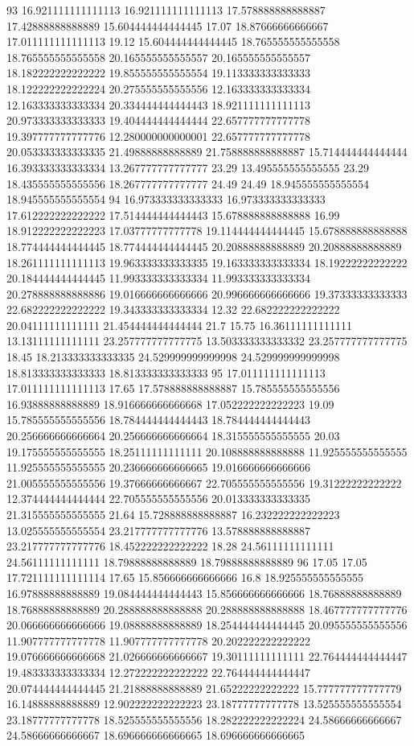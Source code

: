 93 16.921111111111113 16.921111111111113 17.578888888888887 17.42888888888889 15.604444444444445 17.07 18.87666666666667 17.011111111111113 19.12 15.604444444444445 18.765555555555558 18.765555555555558 20.165555555555557 20.165555555555557 18.182222222222222 19.855555555555554 19.113333333333333 18.122222222222224 20.275555555555556 12.163333333333334 12.163333333333334 20.334444444444443 18.921111111111113 20.973333333333333 19.404444444444444 22.657777777777778 19.397777777777776 12.280000000000001 22.657777777777778 20.053333333333335 21.49888888888889 21.758888888888887 15.714444444444444 16.393333333333334 13.267777777777777 23.29 13.495555555555555 23.29 18.435555555555556 18.267777777777777 24.49 24.49 18.945555555555554 18.945555555555554
94 16.973333333333333 16.973333333333333 17.612222222222222 17.514444444444443 15.678888888888888 16.99 18.912222222222223 17.03777777777778 19.114444444444445 15.678888888888888 18.774444444444445 18.774444444444445 20.20888888888889 20.20888888888889 18.261111111111113 19.963333333333335 19.163333333333334 18.19222222222222 20.184444444444445 11.993333333333334 11.993333333333334 20.278888888888886 19.016666666666666 20.996666666666666 19.37333333333333 22.682222222222222 19.343333333333334 12.32 22.682222222222222 20.04111111111111 21.454444444444444 21.7 15.75 16.36111111111111 13.13111111111111 23.257777777777775 13.503333333333332 23.257777777777775 18.45 18.213333333333335 24.529999999999998 24.529999999999998 18.813333333333333 18.813333333333333
95 17.011111111111113 17.011111111111113 17.65 17.578888888888887 15.785555555555556 16.93888888888889 18.916666666666668 17.052222222222223 19.09 15.785555555555556 18.784444444444443 18.784444444444443 20.256666666666664 20.256666666666664 18.315555555555555 20.03 19.175555555555555 18.25111111111111 20.108888888888888 11.925555555555555 11.925555555555555 20.236666666666665 19.016666666666666 21.005555555555556 19.37666666666667 22.705555555555556 19.31222222222222 12.374444444444444 22.705555555555556 20.013333333333335 21.315555555555555 21.64 15.728888888888887 16.232222222222223 13.025555555555554 23.217777777777776 13.578888888888887 23.217777777777776 18.452222222222222 18.28 24.56111111111111 24.56111111111111 18.79888888888889 18.79888888888889
96 17.05 17.05 17.721111111111114 17.65 15.856666666666666 16.8 18.925555555555555 16.97888888888889 19.084444444444443 15.856666666666666 18.76888888888889 18.76888888888889 20.288888888888888 20.288888888888888 18.467777777777776 20.066666666666666 19.08888888888889 18.254444444444445 20.095555555555556 11.907777777777778 11.907777777777778 20.202222222222222 19.076666666666668 21.026666666666667 19.30111111111111 22.764444444444447 19.483333333333334 12.272222222222222 22.764444444444447 20.074444444444445 21.21888888888889 21.65222222222222 15.777777777777779 16.14888888888889 12.902222222222223 23.18777777777778 13.525555555555554 23.18777777777778 18.525555555555556 18.282222222222224 24.58666666666667 24.58666666666667 18.696666666666665 18.696666666666665
